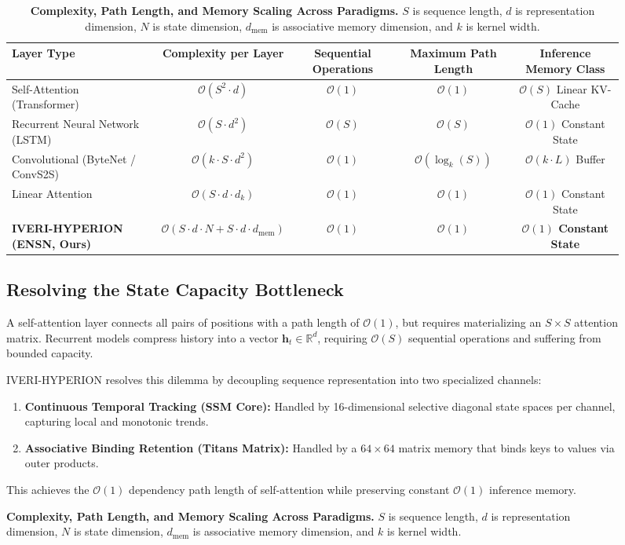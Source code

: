 \documentclass[10pt,twocolumn,letterpaper]{article}
\begin{document}
\begin{figure}[t]
\begin{table}[t]
\centering
\small
\caption{\textbf{Complexity, Path Length, and Memory Scaling Across Paradigms.} $S$ is sequence length, $d$ is representation dimension, $N$ is state dimension, $d_{\text{mem}}$ is associative memory dimension, and $k$ is kernel width.}
\label{tab:complexity}
\begin{tabular}{lcccc}
\toprule
\textbf{Layer Type} & \textbf{Complexity per Layer} & \textbf{Sequential Operations} & \textbf{Maximum Path Length} & \textbf{Inference Memory Class} \\
\midrule
Self-Attention (Transformer)~\cite{vaswani2017attention} & $\mathcal{O}(S^2 \cdot d)$ & $\mathcal{O}(1)$ & $\mathcal{O}(1)$ & $\mathcal{O}(S)$ Linear KV-Cache \\
Recurrent Neural Network (LSTM)~\cite{hochreiter1997lstm} & $\mathcal{O}(S \cdot d^2)$ & $\mathcal{O}(S)$ & $\mathcal{O}(S)$ & $\mathcal{O}(1)$ Constant State \\
Convolutional (ByteNet / ConvS2S)~\cite{kalchbrenner2016bytenet} & $\mathcal{O}(k \cdot S \cdot d^2)$ & $\mathcal{O}(1)$ & $\mathcal{O}(\log_k(S))$ & $\mathcal{O}(k \cdot L)$ Buffer \\
Linear Attention~\cite{katharopoulos2020transformers} & $\mathcal{O}(S \cdot d \cdot d_k)$ & $\mathcal{O}(1)$ & $\mathcal{O}(1)$ & $\mathcal{O}(1)$ Constant State \\
\textbf{IVERI-HYPERION (ENSN, Ours)} & \textbf{$\mathcal{O}(S \cdot d \cdot N + S \cdot d \cdot d_{\text{mem}})$} & \textbf{$\mathcal{O}(1)$} & \textbf{$\mathcal{O}(1)$} & \textbf{$\mathcal{O}(1)$ Constant State} \\
\bottomrule
\end{tabular}
\end{table}

\subsection{Resolving the State Capacity Bottleneck}
A self-attention layer connects all pairs of positions with a path length of $\mathcal{O}(1)$, but requires materializing an $S \times S$ attention matrix. Recurrent models compress history into a vector $\mathbf{h}_t \in \mathbb{R}^d$, requiring $\mathcal{O}(S)$ sequential operations and suffering from bounded capacity.

IVERI-HYPERION resolves this dilemma by decoupling sequence representation into two specialized channels:
\begin{enumerate}[leftmargin=*]
    \item \textbf{Continuous Temporal Tracking (SSM Core):} Handled by 16-dimensional selective diagonal state spaces per channel, capturing local and monotonic trends.
    \item \textbf{Associative Binding Retention (Titans Matrix):} Handled by a $64 \times 64$ matrix memory that binds keys to values via outer products.
\end{enumerate}
This achieves the $\mathcal{O}(1)$ dependency path length of self-attention while preserving constant $\mathcal{O}(1)$ inference memory.


\end{figure}
\end{document}
